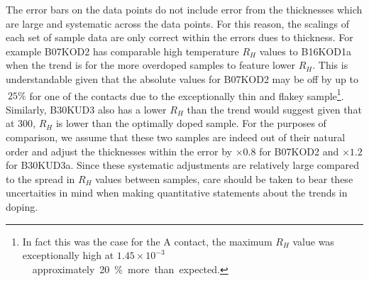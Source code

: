The error bars on the data points do not include error from the thicknesses which are large and systematic across the data points. For this reason, the scalings of each set of sample data are only correct within the errors dues to thickness. For example B07KOD2 has comparable high temperature $R_H$ values to B16KOD1a when the trend is for the more overdoped samples to feature lower $R_H$. This is understandable given that the absolute values for B07KOD2 may be off by up to $~25\%$ for one of the contacts due to the exceptionally thin and flakey sample\footnote{In fact this was the case for the A contact, the maximum $R_H$ value was exceptionally high at \unit{$1.45\times10^{-3}$}{\centi\metre\cubed} approximately \unit{20}{\%} more than expected.}. Similarly, B30KUD3 also has a lower $R_H$ than the trend would suggest given that at \unit{300}{\kelvin}, $R_H$ is lower than the optimally doped sample. For the purposes of comparison, we assume that these two samples are indeed out of their natural order and adjust the thicknesses within the error by $\times0.8$ for B07KOD2 and $\times1.2$ for B30KUD3a. Since these systematic adjustments are relatively large compared to the spread in $R_H$ values between samples,  care should be taken to bear these uncertaities in mind when making quantitative statements about the trends in doping.




